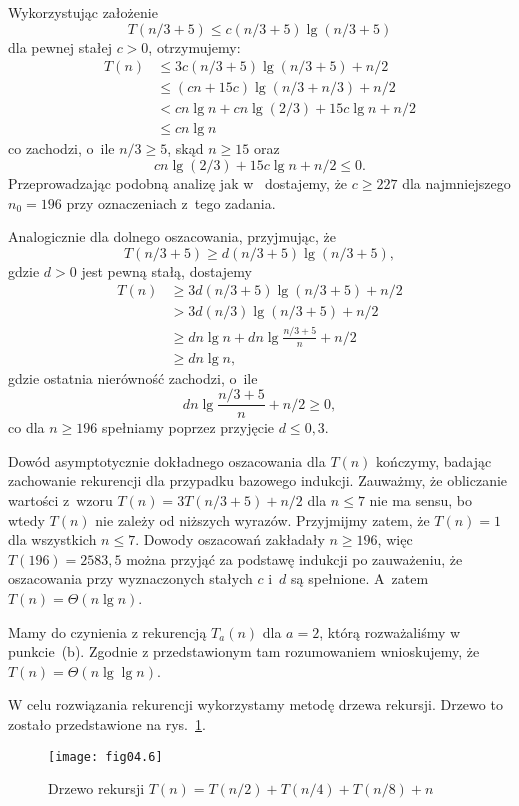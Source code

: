 Wykorzystując założenie
\[
	T(n/3+5) \le c(n/3+5)\lg(n/3+5)
\]
dla pewnej stałej $c>0$, otrzymujemy:
\begin{align*}
	T(n) &\le 3c(n/3+5)\lg(n/3+5)+n/2 \\
	&\le (cn+15c)\lg(n/3+n/3)+n/2 \\
	&< cn\lg n+cn\lg(2/3)+15c\lg n+n/2 \\
	&\le cn\lg n
\end{align*}
co zachodzi, o~ile $n/3\ge5$, skąd $n\ge15$ oraz
\[
    cn\lg(2/3)+15c\lg n+n/2 \le 0.
\]
Przeprowadzając podobną analizę jak w~ dostajemy, że $c\ge227$ dla najmniejszego $n_0=196$ przy oznaczeniach z~tego zadania.

Analogicznie dla dolnego oszacowania, przyjmując, że
\[
	T(n/3+5) \ge d(n/3+5)\lg(n/3+5),
\]
gdzie $d>0$ jest pewną stałą, dostajemy
\begin{align*}
	T(n) &\ge 3d(n/3+5)\lg(n/3+5)+n/2 \\
	&> 3d(n/3)\lg(n/3+5)+n/2 \\
	&\ge dn\lg n+dn\lg\frac{n/3+5}{n}+n/2 \\
	&\ge dn\lg n,
\end{align*}
gdzie ostatnia nierówność zachodzi, o~ile
\[
    dn\lg\frac{n/3+5}{n}+n/2 \ge 0,
\]
co dla $n\ge196$ spełniamy poprzez przyjęcie $d\le0{,}3$.

Dowód asymptotycznie dokładnego oszacowania dla $T(n)$ kończymy, badając zachowanie rekurencji dla przypadku bazowego indukcji. Zauważmy, że obliczanie wartości z~wzoru $T(n)=3T(n/3+5)+n/2$ dla $n\le7$ nie ma sensu, bo wtedy $T(n)$ nie zależy od niższych wyrazów. Przyjmijmy zatem, że $T(n)=1$ dla wszystkich $n\le7$. Dowody oszacowań zakładały $n\ge196$, więc $T(196)=2583{,}5$ można przyjąć za podstawę indukcji po zauważeniu, że oszacowania przy wyznaczonych stałych $c$ i~$d$ są spełnione. A~zatem $T(n)=\Theta(n\lg n)$.

\subproblem %
Mamy do czynienia z rekurencją $T_a(n)$ dla $a=2$, którą rozważaliśmy w punkcie~(b). Zgodnie z przedstawionym tam rozumowaniem wnioskujemy, że $T(n)=\Theta(n\lg\lg n)$.

\subproblem %
W celu rozwiązania rekurencji wykorzystamy metodę drzewa rekursji. Drzewo to zostało przedstawione na rys.~\ref{fig:4-4f}.
\begin{figure}[ht]
	\begin{center}
		\texttt{[image: fig04.6]}
	\end{center}
	\caption{Drzewo rekursji $T(n)=T(n/2)+T(n/4)+T(n/8)+n$} \label{fig:4-4f}
\end{figure}

